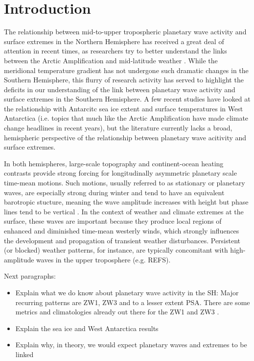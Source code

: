 \section{Introduction}\label{s:introduction}

The relationship between mid-to-upper tropospheric planetary wave activity and surface extremes in the Northern Hemisphere has received a great deal of attention in recent times, as researchers try to better understand the links between the Arctic Amplification and mid-latitude weather \citep[e.g.][]{Cohen2014,Screen2014}. While the meridional temperature gradient has not undergone such dramatic changes in the Southern Hemisphere, this flurry of research activity has served to highlight the deficits in our understanding of the link between planetary wave activity and surface extremes in the Southern Hemisphere. A few recent studies have looked at the relationship with Antarcitc sea ice extent \citep{Raphael2007,Raphael2014} and surface temperatures in West Antarctica \citep{Ding2011,Ding2013} (i.e. topics that much like the Arctic Amplification have made climate change headlines in recent years), but the literature currently lacks a broad, hemispheric perspective of the relationship between planetary wave acitivity and surface extremes. 

In both hemispheres, large-scale topography and continent-ocean heating contrasts provide strong forcing for longitudinally asymmetric planetary scale time-mean motions. Such motions, usually referred to as stationary or planetary waves, are especially strong during winter and tend to have an equivalent barotropic stucture, meaning the wave amplitude increases with height but phase lines tend to be vertical \citep{Holton2013}. In the context of weather and climate extremes at the surface, these waves are important because they produce local regions of enhanced and diminished time-mean westerly winds, which strongly influences the development and propagation of transient weather disturbances. Persistent (or blocked) weather patterns, for instance, are typically concomitant with high-amplitude waves in the upper troposphere (e.g. REFS).


Next paragraphs:
\begin{itemize}
\item Explain what we do know about planetary wave activity in the SH: Major recurring patterns are ZW1, ZW3 and to a lesser extent PSA. There are some metrics and climatologies already out there for the ZW1 and ZW3 \citep{Raphael2004,Hobbs2007}.
\item Explain the sea ice and West Antarctica results
\item Explain why, in theory, we would expect planetary waves and extremes to be linked
\end{itemize}
